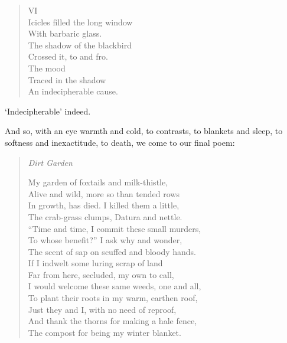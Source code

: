 \documentclass[12pt,oneside]{memoir}
\begin{document}
\begin{verse}

VI \\
Icicles filled the long window \\
With barbaric glass. \\
The shadow of the blackbird \\
Crossed it, to and fro. \\
The mood \\
Traced in the shadow \\
An indecipherable cause.

\parencite{blackbird}
\end{verse}

`Indecipherable' indeed.

And so, with an eye warmth and cold, to contrasts, to blankets and sleep, to softness and inexactitude, to death, we come to our final poem:

\begin{verse}
\emph{Dirt Garden}

My garden of foxtails and milk-thistle, \\
Alive and wild, more so than tended rows \\
In growth, has died. I killed them a little, \\
The crab-grass clumps, Datura and nettle. \\
``Time and time, I commit these small murders, \\
To whose benefit?'' I ask why and wonder, \\
The scent of sap on scuffed and bloody hands. \\
If I indwelt some luring scrap of land \\
Far from here, secluded, my own to call, \\
I would welcome these same weeds, one and all, \\
To plant their roots in my warm, earthen roof, \\
Just they and I, with no need of reproof, \\
And thank the thorns for making a hale fence, \\
The compost for being my winter blanket.

\parencite[5]{leaves}
\end{verse}
\end{document}
